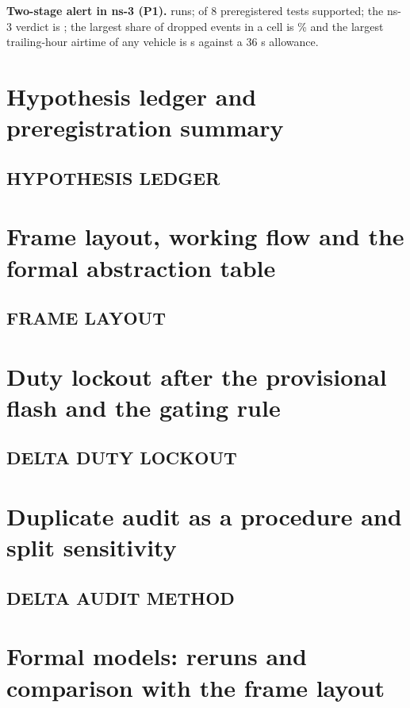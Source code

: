 \documentclass[10pt,a4paper]{article}
\begin{document}
\textbf{Two-stage alert in ns-3 (P1).} \NsRuns{} runs; \NsSupported{} of 8 preregistered tests supported; the ns-3 verdict is \NsVerdict{}; the largest share of dropped events in a cell is \NsDropMax\% and the largest trailing-hour airtime of any vehicle is \NsDutyMax{} s against a 36 s allowance.


\section{Hypothesis ledger and preregistration summary}

\subsection{HYPOTHESIS LEDGER}


\section{Frame layout, working flow and the formal abstraction table}

\subsection{FRAME LAYOUT}


\section{Duty lockout after the provisional flash and the gating rule}

\subsection{DELTA DUTY LOCKOUT}


\section{Duplicate audit as a procedure and split sensitivity}

\subsection{DELTA AUDIT METHOD}


\section{Formal models: reruns and comparison with the frame layout}
\end{document}
